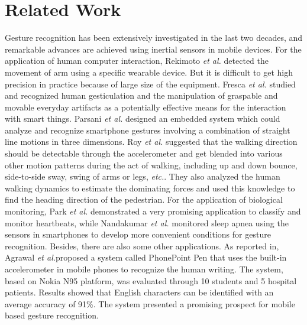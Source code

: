 \documentclass[review]{elsarticle}
\newcommand{\etal}{\textit{et al.}}
\begin{document}
\section{Related Work}\label{sec:relatedwork}{Gesture recognition has been extensively investigated in the last two decades, and remarkable advances are achieved using inertial sensors in mobile devices\;\cite{rekimoto2001iswc,jang2003signal,kallio2003online,bulling2014a}. For the application of human computer interaction, Rekimoto \etal\;\cite{rekimoto2001iswc} detected the movement of arm using a specific wearable device. But it is difficult to get high precision in practice because of large size of the equipment. Fresca \etal \;\cite{ferscha2007gestural} studied and recognized human gesticulation and the manipulation of graspable and movable everyday artifacts as a potentially effective means for the interaction with smart things. Parsani \etal \;\cite{Parsani2009A} designed an embedded system which could analyze and recognize smartphone gestures involving a combination of straight line motions in three dimensions. Roy \etal \;\cite{Roy2014Demo} suggested that the walking direction should be detectable through the accelerometer and get blended into various other motion patterns during the act of walking, including up and down bounce, side-to-side sway, swing of arms or legs, \emph{etc.}. They also analyzed the human walking dynamics to estimate the dominating forces and used this knowledge to find the heading direction of the pedestrian. For the application of biological monitoring, Park \etal\;\cite{Park2014Poster} demonstrated a very promising application to classify and monitor heartbeats, while Nandakumar \etal \;\cite{Nandakumar2015Contactless} monitored sleep apnea using the sensors in smartphones to develop more convenient conditions for gesture recognition\;\cite{hoang2013adaptive}. Besides, there are also some other applications.} As reported in\;\cite{Agrawal2011Using}, Agrawal \etal  proposed a system called PhonePoint Pen that uses the built-in accelerometer in mobile phones to recognize the human writing. The system, based on Nokia N95 platform, was evaluated through 10 students and 5 hospital patients. Results showed that English characters can be identified with an average accuracy of 91\%. The system presented a promising prospect for mobile based gesture recognition.
\end{document}

